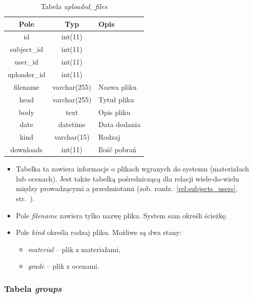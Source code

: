 \documentclass[a4paper,12pt,oneside]{report}
\begin{document}
\begin{table}[h]
  \centering
  \begin{tabular}{|c|c|l|}\hline
  Pole & Typ & Opis \\\hline
  id           & int(11)      & \\
  subject\_id  & int(11)      & \\
  user\_id     & int(11)      & \\
  uploader\_id & int(11)      & \\
  filename     & varchar(255) & Nazwa pliku \\
  head         & varchar(255) & Tytuł pliku \\
  body         & text         & Opis pliku \\
  date         & datetime     & Data dodania \\
  kind         & varchar(15)  & Rodzaj \\
  downloads    & int(11)      & Ilość pobrań \\\hline
  \end{tabular}
  \caption{Tabela \emph{uploaded\_files}\label{tab:uploaded_files}}
\end{table}

\begin{itemize}
  \item Tabelka ta zawiera informacje o plikach wgranych do systemu (materiałach lub ocenach). Jest także tabelką pośredniczącą dla relacji wiele-do-wielu między prowadzącymi a przedmiotami (zob. rozdz.~\ref{rel:subjects_users}, str.~\pageref{rel:subjects_users}).
  \item Pole \emph{filename} zawiera tylko nazwę pliku. System sam określi ścieżkę.
  \item Pole \emph{kind} określa rodzaj pliku. Możliwe są dwa stany:
  \begin{itemize}
    \item \emph{material} -- plik z materiałami,
    \item \emph{grade} -- plik z ocenami.
  \end{itemize}
\end{itemize}

\subsubsection{Tabela \emph{groups}}
\label{subsub:groups}
\end{document}

